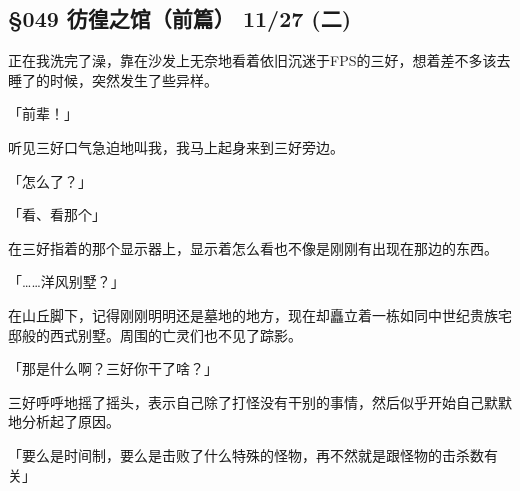 \subsection{§049 彷徨之馆（前篇） 11/27 (二)}

正在我洗完了澡，靠在沙发上无奈地看着依旧沉迷于FPS的三好，想着差不多该去睡了的时候，突然发生了些异样。

「前辈！」

听见三好口气急迫地叫我，我马上起身来到三好旁边。

「怎么了？」

「看、看那个」

在三好指着的那个显示器上，显示着怎么看也不像是刚刚有出现在那边的东西。

「……洋风别墅？」

在山丘脚下，记得刚刚明明还是墓地的地方，现在却矗立着一栋如同中世纪贵族宅邸般的西式别墅。周围的亡灵们也不见了踪影。

「那是什么啊？三好你干了啥？」

三好呼呼地摇了摇头，表示自己除了打怪没有干别的事情，然后似乎开始自己默默地分析起了原因。

「要么是时间制，要么是击败了什么特殊的怪物，再不然就是跟怪物的击杀数有关」

